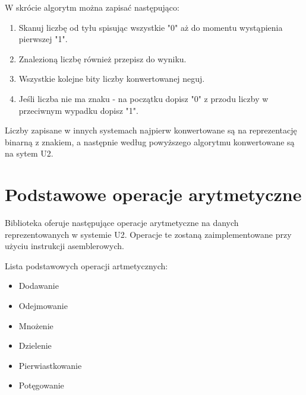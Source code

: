 \documentclass{article}
\begin{document}
\vspace{5mm} %

W skrócie algorytm można zapisać następująco:
\begin{enumerate}
    \item Skanuj liczbę od tyłu spisując wszystkie "0" aż do momentu wystąpienia pierwszej "1".
    \item Znalezioną liczbę również przepisz do wyniku.
    \item Wszystkie kolejne bity liczby konwertowanej neguj.
    \item Jeśli liczba nie ma znaku - na początku dopisz "0" z przodu liczby w przeciwnym wypadku dopisz "1".
\end{enumerate}

Liczby zapisane w innych systemach najpierw konwertowane są na reprezentację binarną z znakiem, a następnie według powyższego algorytmu konwertowane są na sytem U2.

\section{Podstawowe operacje arytmetyczne}
Biblioteka oferuje następujące operacje arytmetyczne na danych reprezentowanych w systemie U2. Operacje te zostaną zaimplementowane przy użyciu instrukcji asemblerowych.

\vspace{5mm} %

Lista podstawowych operacji artmetycznych:
\begin{itemize}
    \item Dodawanie
    \item Odejmowanie
    \item Mnożenie
    \item Dzielenie
    \item Pierwiastkowanie
    \item Potęgowanie
\end{itemize}
\end{document}
